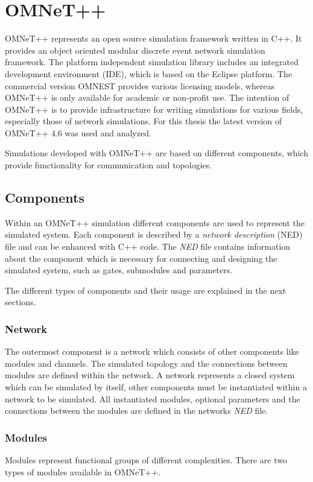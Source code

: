 \chapter{OMNeT++}
\label{cha:omnet}
OMNeT++ represents an open source simulation framework written in C++.
It provides an object oriented modular discrete event network simulation framework.
The platform independent simulation library includes an integrated development environment (IDE), which is based on the Eclipse platform.
The commercial version OMNEST provides various licensing models, whereas OMNeT++ is only available for academic or non-profit use.
The intention of OMNeT++ is to provide infrastructure for writing simulations for various fields, especially those of network simulations.
For this thesis the latest version of OMNeT++ 4.6 was used and analyzed.

Simulations developed with OMNeT++ are based on different components, which provide functionality for communication and topologies.

\section{Components}
\label{sec:omnet_components}
Within an OMNeT++ simulation different components are used to represent the simulated system.
Each component is described by a \emph{network description} (NED) file and can be enhanced with C++ code.
The \emph{NED} file contains information about the component which is necessary for connecting and designing the simulated system, such as gates, submodules and parameters.

The different types of components and their usage are explained in the next sections.

\subsection{Network}
\label{sec:omnet_components_network}
The outermost component is a network which consists of other components like modules and channels.
The simulated topology and the connections between modules are defined within the network.
A network represents a closed system which can be simulated by itself, other components must be instantiated within a network to be simulated.
All instantiated modules, optional parameters and the connections between the modules are defined in the networks \emph{NED} file. \cite[section 3.2.1]{omnet_manual}

\subsection{Modules}
\label{sec:omnet_components_modules}
Modules represent functional groups of different complexities.
There are two types of modules available in OMNeT++.

